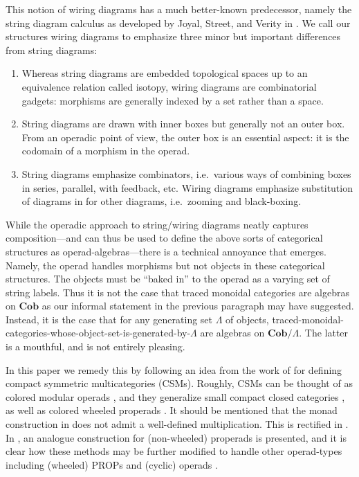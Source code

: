 \documentclass[11pt, article, oneside]{memoir}
\theoremstyle{plain}
\theoremstyle{definition}
\theoremstyle{remark}
\newcommand{\Cat}[1]{\mathbf{#1}}
\newcommand{\Cob}{\Cat{Cob}}
\begin{document}
This notion of wiring diagrams has a much better-known predecessor, namely the string diagram calculus as developed by Joyal, Street, and Verity in \cite{Joyal.Street:1993a, Joyal.Street.Verity:1996a}. We call our structures wiring diagrams to emphasize three minor but important differences from string diagrams:
\begin{enumerate}
	\item Whereas string diagrams are embedded topological spaces up to an equivalence relation called isotopy, wiring diagrams are combinatorial gadgets: morphisms are generally indexed by a set rather than a space.
	\item String diagrams are drawn with inner boxes but generally not an outer box. From an operadic point of view, the outer box is an essential aspect: it is the codomain of a morphism in the operad.
	\item String diagrams emphasize combinators, i.e.\ various ways of combining boxes in series, parallel, with feedback, etc. Wiring diagrams emphasize substitution of diagrams in for other diagrams, i.e.\ zooming and black-boxing.
\end{enumerate}

While the operadic approach to string/wiring diagrams neatly captures composition---and can thus be used to define the above sorts of categorical structures as operad-algebras---there is a technical annoyance that emerges. Namely, the operad handles morphisms but not objects in these categorical structures. The objects must be ``baked in'' to the operad as a varying set of string labels. Thus it is not the case that traced monoidal categories are algebras on $\Cob$ as our informal statement in the previous paragraph may have suggested. Instead, it is the case that for any generating set $\Lambda$ of objects, traced-monoidal-categories-whose-object-set-is-generated-by-$\Lambda$ are algebras on $\Cob/\Lambda$. The latter is a mouthful, and is not entirely pleasing.


In this paper we remedy this by following an idea from the work of \cite{Joyal.Kock} for defining compact symmetric multicategories (CSMs). Roughly, CSMs can be thought of as colored modular operads \cite{}, and they generalize small compact closed categories \cite{}, as well as colored wheeled properads \cite{}. It should be mentioned that the monad construction in \cite{Joyal.Kock} does not admit a well-defined multiplication. This is rectified in \cite{Raynor:2018a}. In \cite{}, an analogue construction for (non-wheeled) properads is presented, and it is clear how these methods may be further modified to handle other operad-types including (wheeled) PROPs \cite{} and (cyclic) operads \cite{}. 
\end{document}
